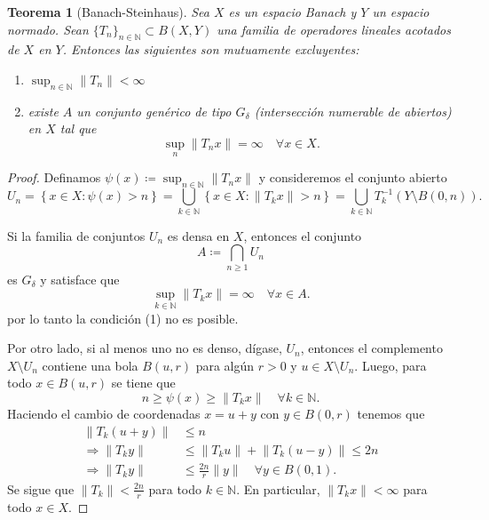\documentclass{article}
\newtheorem{Teorema}{Teorema}
\theoremstyle{plain}
\theoremstyle{definition}
\newcommand{\N}{\mathbb{N}}
\newcommand{\norm}[1]{\lVert #1 \rVert}
\begin{document}
\begin{Teorema}[Banach-Steinhaus]
  Sea \(X\) es un espacio Banach y \(Y\) un espacio normado. 
  Sean \(\lbrace T_n \rbrace_{n\in\N} \subset B(X,Y)\) una familia de operadores
  lineales acotados de \(X\) en \(Y\). Entonces las siguientes son mutuamente excluyentes:
  \begin{enumerate}
    \item \(\sup_{n\in\N} \norm{T_n} < \infty\)
    \item existe \(A\) un conjunto genérico de tipo \(G_{\delta}\) (intersección numerable de abiertos) 
    en \(X\) tal que
    \begin{displaymath}
      \sup_{n} \norm{T_n x} = \infty
      \quad\forall x\in X.
    \end{displaymath}
  \end{enumerate}
\end{Teorema}
\begin{proof}
Definamos \(\psi(x) \coloneqq \sup_{n\in \N} \norm{T_n x}\) y consideremos el conjunto
abierto 
\begin{displaymath}
  U_n 
  = \left\{ x\in X \colon \psi(x) > n \right\}
  = \bigcup_{k\in\N} \left\{ x\in X \colon \norm{T_k x} > n \right\} 
  = \bigcup_{k\in\N} T_k^{-1} \left( Y\setminus B(0,n) \right).
\end{displaymath}

Si la familia de conjuntos \(U_n\) es densa en \(X\), entonces el conjunto
\begin{displaymath}
  A \coloneqq \bigcap_{n\ge 1} U_n 
\end{displaymath}
es \(G_{\delta}\) y satisface que 
\begin{displaymath}
  \sup_{k\in\N} \norm{T_k x} = \infty
  \quad\forall x\in A.
\end{displaymath}
por lo tanto la condición (1) no es posible. 

Por otro lado, si al menos uno no es denso, dígase, \(U_n\), entonces el complemento
\(X\setminus U_n\) contiene una bola \(B(u,r)\) para algún \(r>0\) y \(u\in X\setminus U_n\).
Luego, para todo \(x\in B(u,r)\) se tiene que
\begin{displaymath}
  n \ge \psi(x) \ge \norm{T_k x} \quad \forall k\in\N.
\end{displaymath}
Haciendo el cambio de coordenadas \(x = u+y\) con \(y\in B(0,r)\) tenemos que  
\begin{align*}
  \norm{T_k (u+y)} &\le n
  \\\Rightarrow
  \norm{T_k y}
  &\le
  \norm{T_k u} + \norm{T_k (u-y)}
  \le 2n
  \\\Rightarrow
  \norm{T_k y}
  &\le
  \frac{2n}{r}
  \norm{y}
  \quad\forall y\in B(0,1).
\end{align*}
Se sigue que \(\norm{T_k} < \frac{2n}{r}\) para todo \(k\in \N\). En particular, 
\(\norm{T_k x} < \infty\) para todo \(x\in X\).
\end{proof}
\end{document}
